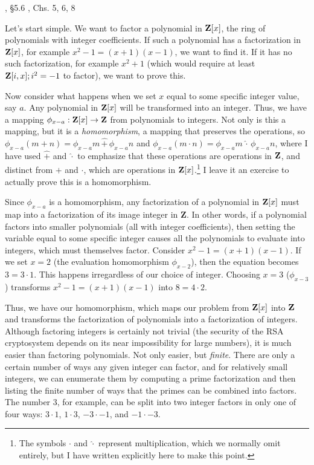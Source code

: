 , \S5.6
\hbox{}\qquad [Geddes], Chs. 5, 6, 8

Let's start simple.  We want to factor a polynomial in ${\bf Z}[x]$,
the ring of polynomials with integer coefficients.  If such a
polynomial has a factorization in ${\bf Z}[x]$, for example
$x^2-1=(x+1)(x-1)$, we want to find it.  If it has no such
factorization, for example $x^2+1$ (which would require at least ${\bf
Z}[i,x]; i^2=-1$ to factor), we want to prove this.

Now consider what happens when we set $x$ equal to some specific
integer value, say $a$.  Any polynomial in ${\bf Z}[x]$ will be
transformed into an integer.  Thus, we have a mapping $\phi_{x-a}:
{\bf Z}[x] \rightarrow {\bf Z}$ from polynomials to integers.  Not
only is this a mapping, but it is a {\it homomorphism}, a mapping that
preserves the operations, so $\phi_{x-a} (m+n) = \phi_{x-a}m \,\hat+\,
\phi_{x-a}n$ and $\phi_{x-a} (m\cdot n) = \phi_{x-a}m \,\hat\cdot\,
\phi_{x-a}n$, where I have used $\hat+$ and $\hat\cdot$ to emphasize
that these operations are operations in ${\bf Z}$, and distinct from
$+$ and $\cdot$, which are operations in ${\bf Z}[x]$.\footnote{The
symbols $\cdot$ and $\hat\cdot$ represent multiplication, which we normally
omit entirely, but I have written explicitly here to make this point.}
I leave it an exercise to actually prove this is a homomorphism.

Since $\phi_{x-a}$ is a homomorphism, any factorization of a
polynomial in ${\bf Z}[x]$ must map into a factorization of its image
integer in {\bf Z}.  In other words, if a polynomial factors into
smaller polynomials (all with integer coefficients), then setting the
variable equal to some specific integer causes all the polynomials to
evaluate into integers, which must themselves factor.  Consider
$x^2-1=(x+1)(x-1)$.  If we set $x=2$ (the evaluation homomorphism
$\phi_{x-2}$), then the equation becomes $3=3\cdot1$.  This happens
irregardless of our choice of integer.  Choosing $x=3$ ($\phi_{x-3}$)
transforms $x^2-1=(x+1)(x-1)$ into $8=4\cdot2$.

Thus, we have our homomorphism, which maps our problem from ${\bf
Z}[x]$ into ${\bf Z}$ and transforms the factorization of polynomials
into a factorization of integers.  Although factoring integers is
certainly not trivial (the security of the RSA cryptosystem depends on
its near impossibility for large numbers), it is much easier than
factoring polynomials.  Not only easier, but {\it finite}.  There are
only a certain number of ways any given integer can factor, and for
relatively small integers, we can enumerate them by computing a prime
factorization and then listing the finite number of ways that the
primes can be combined into factors.  The number $3$, for example, can
be split into two integer factors in only one of four ways: $3\cdot1$,
$1\cdot3$, $-3\cdot-1$, and $-1\cdot-3$.


